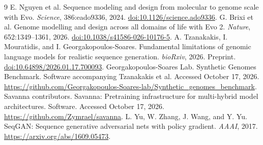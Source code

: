 \documentclass[11pt,letterpaper]{article}
\begin{document}
\clearpage
\begin{thebibliography}{9}
\small
{} E. Nguyen et al. Sequence modeling and design from molecular to genome scale with Evo. \emph{Science}, 386:eado9336, 2024. \href{https://doi.org/10.1126/science.ado9336}{doi:10.1126/science.ado9336}.
 G. Brixi et al. Genome modelling and design across all domains of life with Evo 2. \emph{Nature}, 652:1349--1361, 2026. \href{https://doi.org/10.1038/s41586-026-10176-5}{doi:10.1038/s41586-026-10176-5}.
 A. Tzanakakis, I. Mouratidis, and I. Georgakopoulos-Soares. Fundamental limitations of genomic language models for realistic sequence generation. \emph{bioRxiv}, 2026. Preprint. \href{https://doi.org/10.64898/2026.01.17.700093}{doi:10.64898/2026.01.17.700093}.
 Georgakopoulos-Soares Lab. Synthetic Genomes Benchmark. Software accompanying Tzanakakis et al. Accessed October 17, 2026. \url{https://github.com/Georgakopoulos-Soares-lab/Synthetic_genomes_benchmark}.
 Savanna contributors. Savanna: Pretraining infrastructure for multi-hybrid model architectures. Software. Accessed October 17, 2026. \url{https://github.com/Zymrael/savanna}.
 L. Yu, W. Zhang, J. Wang, and Y. Yu. SeqGAN: Sequence generative adversarial nets with policy gradient. \emph{AAAI}, 2017. \url{https://arxiv.org/abs/1609.05473}.
\end{thebibliography}
\end{document}
